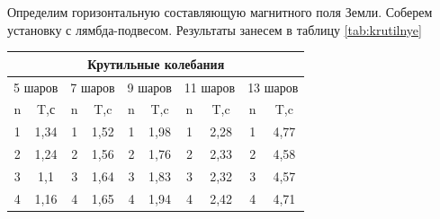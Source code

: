 \documentclass[a4paper, 12pt]{article}
\begin{document}
Определим горизонтальную составляющую магнитного поля Земли. Соберем установку с лямбда-подвесом. Результаты занесем в таблицу \ref{tab:krutilnye}
\begin{table}[h]
	\centering
	\begin{tabular}{|cccccccccc|}
	\hline
	\multicolumn{10}{|c|}{Крутильные колебания}                                                                                                                                                                                                                                                \\ \hline
	\multicolumn{2}{|c|}{5 шаров}                               & \multicolumn{2}{c|}{7 шаров}                                & \multicolumn{2}{c|}{9 шаров}                               & \multicolumn{2}{c|}{11 шаров}                               & \multicolumn{2}{c|}{13 шаров}       \\ \hline
	\multicolumn{1}{|c|}{n}      & \multicolumn{1}{c|}{T,с}       & \multicolumn{1}{c|}{n}      & \multicolumn{1}{c|}{T,c}        & \multicolumn{1}{c|}{n}      & \multicolumn{1}{c|}{T,c}       & \multicolumn{1}{c|}{n}      & \multicolumn{1}{c|}{T,c}        & \multicolumn{1}{c|}{n}      & T,c     \\ \hline
	\multicolumn{1}{|c|}{1}      & \multicolumn{1}{c|}{1,34}    & \multicolumn{1}{c|}{1}      & \multicolumn{1}{c|}{1,52}     & \multicolumn{1}{c|}{1}      & \multicolumn{1}{c|}{1,98}    & \multicolumn{1}{c|}{1}      & \multicolumn{1}{c|}{2,28}     & \multicolumn{1}{c|}{1}      & 4,77  \\ \hline
	\multicolumn{1}{|c|}{2}      & \multicolumn{1}{c|}{1,24}    & \multicolumn{1}{c|}{2}      & \multicolumn{1}{c|}{1,56}     & \multicolumn{1}{c|}{2}      & \multicolumn{1}{c|}{1,76}    & \multicolumn{1}{c|}{2}      & \multicolumn{1}{c|}{2,33}     & \multicolumn{1}{c|}{2}      & 4,58  \\ \hline
	\multicolumn{1}{|c|}{3}      & \multicolumn{1}{c|}{1,1}     & \multicolumn{1}{c|}{3}      & \multicolumn{1}{c|}{1,64}     & \multicolumn{1}{c|}{3}      & \multicolumn{1}{c|}{1,83}    & \multicolumn{1}{c|}{3}      & \multicolumn{1}{c|}{2,32}     & \multicolumn{1}{c|}{3}      & 4,57  \\ \hline
	\multicolumn{1}{|c|}{4}      & \multicolumn{1}{c|}{1,16}    & \multicolumn{1}{c|}{4}      & \multicolumn{1}{c|}{1,65}     & \multicolumn{1}{c|}{4}      & \multicolumn{1}{c|}{1,94}    & \multicolumn{1}{c|}{4}      & \multicolumn{1}{c|}{2,42}     & \multicolumn{1}{c|}{4}      & 4,71  \\ \hline

\end{tabular}
\end{table}
\end{document}
